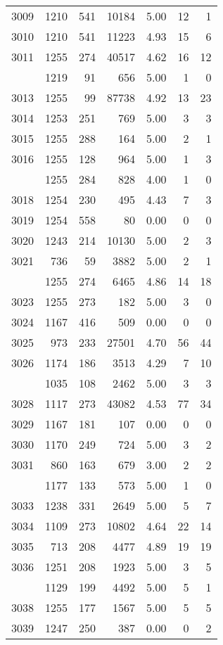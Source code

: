 \documentclass[
]{article}
\begin{document}
\begin{table}
\begin{tabular}[t]{lrrrrrr}
3009 & 1210 & 541 & 10184 & 5.00 & 12 & 1\\
3010 & 1210 & 541 & 11223 & 4.93 & 15 & 6\\
3011 & 1255 & 274 & 40517 & 4.62 & 16 & 12\\
\addlinespace
3012 & 1219 & 91 & 656 & 5.00 & 1 & 0\\
3013 & 1255 & 99 & 87738 & 4.92 & 13 & 23\\
3014 & 1253 & 251 & 769 & 5.00 & 3 & 3\\
3015 & 1255 & 288 & 164 & 5.00 & 2 & 1\\
3016 & 1255 & 128 & 964 & 5.00 & 1 & 3\\
\addlinespace
3017 & 1255 & 284 & 828 & 4.00 & 1 & 0\\
3018 & 1254 & 230 & 495 & 4.43 & 7 & 3\\
3019 & 1254 & 558 & 80 & 0.00 & 0 & 0\\
3020 & 1243 & 214 & 10130 & 5.00 & 2 & 3\\
3021 & 736 & 59 & 3882 & 5.00 & 2 & 1\\
\addlinespace
3022 & 1255 & 274 & 6465 & 4.86 & 14 & 18\\
3023 & 1255 & 273 & 182 & 5.00 & 3 & 0\\
3024 & 1167 & 416 & 509 & 0.00 & 0 & 0\\
3025 & 973 & 233 & 27501 & 4.70 & 56 & 44\\
3026 & 1174 & 186 & 3513 & 4.29 & 7 & 10\\
\addlinespace
3027 & 1035 & 108 & 2462 & 5.00 & 3 & 3\\
3028 & 1117 & 273 & 43082 & 4.53 & 77 & 34\\
3029 & 1167 & 181 & 107 & 0.00 & 0 & 0\\
3030 & 1170 & 249 & 724 & 5.00 & 3 & 2\\
3031 & 860 & 163 & 679 & 3.00 & 2 & 2\\
\addlinespace
3032 & 1177 & 133 & 573 & 5.00 & 1 & 0\\
3033 & 1238 & 331 & 2649 & 5.00 & 5 & 7\\
3034 & 1109 & 273 & 10802 & 4.64 & 22 & 14\\
3035 & 713 & 208 & 4477 & 4.89 & 19 & 19\\
3036 & 1251 & 208 & 1923 & 5.00 & 3 & 5\\
\addlinespace
3037 & 1129 & 199 & 4492 & 5.00 & 5 & 1\\
3038 & 1255 & 177 & 1567 & 5.00 & 5 & 5\\
3039 & 1247 & 250 & 387 & 0.00 & 0 & 2\\

\end{tabular}
\end{table}
\end{document}
